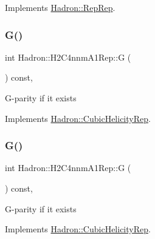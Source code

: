 Implements \mbox{\hyperlink{structHadron_1_1RepRep_a92c8802e5ed7afd7da43ccfd5b7cd92b}{Hadron\+::\+Rep\+Rep}}.

\mbox{\label{structHadron_1_1H2C4nnmA1Rep_a36b5108120e840ea7de9a5e25a7115ed}} 
\subsubsection{\texorpdfstring{G()}{G()}\hspace{0.1cm}{\footnotesize\ttfamily [1/3]}}
{\footnotesize\ttfamily int Hadron\+::\+H2\+C4nnm\+A1\+Rep\+::G (\begin{DoxyParamCaption}{ }\end{DoxyParamCaption}) const\hspace{0.3cm}{\ttfamily [inline]}, {\ttfamily [virtual]}}

G-\/parity if it exists 

Implements \mbox{\hyperlink{structHadron_1_1CubicHelicityRep_a50689f42be1e6170aa8cf6ad0597018b}{Hadron\+::\+Cubic\+Helicity\+Rep}}.

\mbox{\label{structHadron_1_1H2C4nnmA1Rep_a36b5108120e840ea7de9a5e25a7115ed}} 
\subsubsection{\texorpdfstring{G()}{G()}\hspace{0.1cm}{\footnotesize\ttfamily [2/3]}}
{\footnotesize\ttfamily int Hadron\+::\+H2\+C4nnm\+A1\+Rep\+::G (\begin{DoxyParamCaption}{ }\end{DoxyParamCaption}) const\hspace{0.3cm}{\ttfamily [inline]}, {\ttfamily [virtual]}}

G-\/parity if it exists 

Implements \mbox{\hyperlink{structHadron_1_1CubicHelicityRep_a50689f42be1e6170aa8cf6ad0597018b}{Hadron\+::\+Cubic\+Helicity\+Rep}}.

\mbox{\label{structHadron_1_1H2C4nnmA1Rep_a36b5108120e840ea7de9a5e25a7115ed}} 
